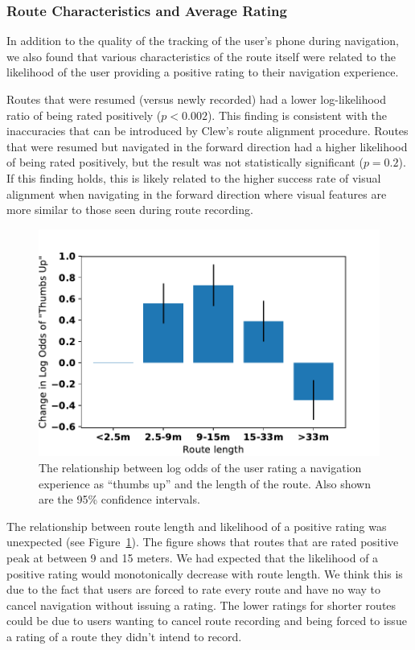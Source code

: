\documentclass[chi_draft]{sigchi}
\begin{document}
\subsubsection{Route Characteristics and Average Rating}
In addition to the quality of the tracking of the user's phone during navigation, we also found that various characteristics of the route itself were related to the likelihood of the user providing a positive rating to their navigation experience.

Routes that were resumed (versus newly recorded) had a lower log-likelihood ratio of being rated positively ($p < 0.002$).  This finding is consistent with the inaccuracies that can be introduced by Clew's route alignment procedure.  Routes that were resumed but navigated in the forward direction had a higher likelihood of being rated positively, but the result was not statistically significant ($p = 0.2$). If this finding holds, this is likely related to the higher success rate of visual alignment when navigating in the forward direction where visual features are more similar to those seen during route recording.

\begin{figure}
\includegraphics[width=\linewidth]{figures/routelength}
\caption{The relationship between log odds of the user rating a navigation experience as ``thumbs up'' and the length of the route.  Also shown are the 95\% confidence intervals.\label{fig:routelength}}
\end{figure}

The relationship between route length and likelihood of a positive rating was unexpected (see Figure~\ref{fig:routelength}).  The figure shows that routes that are rated positive peak at between 9 and 15 meters. We had expected that the likelihood of a positive rating would monotonically decrease with route length.  We think this is due to the fact that users are forced to rate every route and have no way to cancel navigation without issuing a rating.  The lower ratings for shorter routes could be due to users wanting to cancel route recording and being forced to issue a rating of a route they didn't intend to record.
\end{document}
